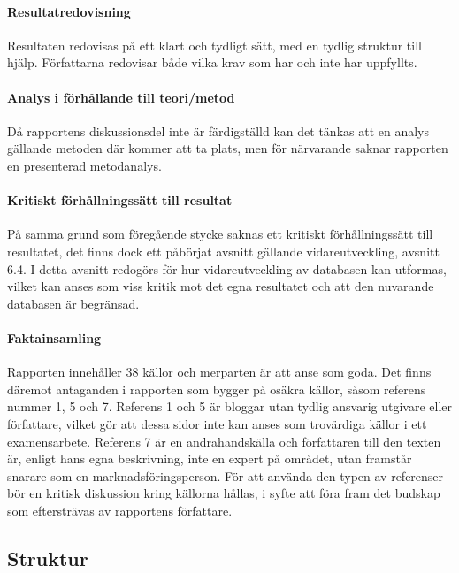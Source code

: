     \paragraph{Resultatredovisning}
        Resultaten redovisas på ett klart och tydligt sätt, med en tydlig struktur till hjälp. Författarna redovisar både vilka krav som har och inte har uppfyllts.

    \paragraph{Analys i förhållande till teori/metod}
        Då rapportens diskussionsdel inte är färdigställd kan det tänkas att en analys gällande metoden där kommer att ta plats, men för närvarande saknar rapporten en presenterad metodanalys.

    \paragraph{Kritiskt förhållningssätt till resultat}
        På samma grund som föregående stycke saknas ett kritiskt förhållningssätt till resultatet, det finns dock ett påbörjat avsnitt gällande vidareutveckling, avsnitt 6.4. I detta avsnitt redogörs för hur vidareutveckling av databasen kan utformas, vilket kan anses som viss kritik mot det egna resultatet och att den nuvarande databasen är begränsad.

    \paragraph{Faktainsamling}
        Rapporten innehåller 38 källor och merparten är att anse som goda. Det finns däremot antaganden i rapporten som bygger på osäkra källor, såsom referens nummer 1, 5 och 7. Referens 1 och 5 är bloggar utan tydlig ansvarig utgivare eller författare, vilket gör att dessa sidor inte kan anses som trovärdiga källor i ett examensarbete. Referens 7 är en andrahandskälla och författaren till den texten är, enligt hans egna beskrivning, inte en expert på området, utan framstår snarare som en marknadsföringsperson. För att använda den typen av referenser bör en kritisk diskussion kring källorna hållas, i syfte att föra fram det budskap som eftersträvas av rapportens författare.


    \subsection{Struktur} %
    \label{sub:struktur}
